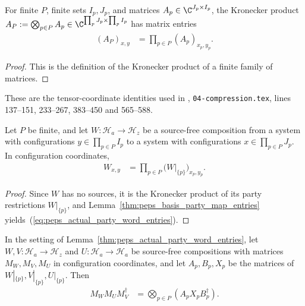 \begin{lemma}
    \label{thm:peps_basis_party_map_entries}
    \leanok
    For finite $P$, finite sets $I_p,J_p$, and matrices $A_p\in\C^{J_p\times I_p}$, the Kronecker product $A_P:=\bigotimes_{p\in P}A_p\in\C^{\prod_pJ_p\times\prod_pI_p}$ has matrix entries
    \begin{align}
        (A_P)_{x,y}
         & =\prod_{p\in P}(A_p)_{x_p,y_p}.
    \end{align}
\end{lemma}

\begin{proof}
    \leanok
    This is the definition of the Kronecker product of a finite family of matrices.
\end{proof}

These are the tensor-coordinate identities used in
\cite[proof of Theorem~5.2]{OpenAI2026PolynomialPEPS},
\texttt{04-compression.tex}, lines 137--151, 233--267, 383--450 and
565--588.


\begin{lemma}
    \label{thm:peps_actual_party_word_entries}
    \leanok
    Let $P$ be finite, and let $W:\mathcal H_a\to\mathcal H_z$ be a source-free composition from a system with configurations $y\in\prod_{p\in P}I_p$ to a system with configurations $x\in\prod_{p\in P}J_p$. In configuration coordinates,
    \begin{align}
        W_{x,y}
         & =\prod_{p\in P}
        \bigl(W|_{\{p\}}\bigr)_{x_p,y_p}.
        \label{eq:peps_actual_party_word_entries}
    \end{align}
\end{lemma}

\begin{proof}\leanok
    Since $W$ has no sources, it is the Kronecker product of its party restrictions $W|_{\{p\}}$, and Lemma~\ref{thm:peps_basis_party_map_entries} yields~(\ref{eq:peps_actual_party_word_entries}).
\end{proof}

\begin{lemma}
    \label{thm:peps_actual_party_mixed_matrix}
    \leanok
    In the setting of Lemma~\ref{thm:peps_actual_party_word_entries}, let $W,V:\mathcal H_a\to\mathcal H_z$ and $U:\mathcal H_a\to\mathcal H_a$ be source-free compositions with matrices $M_W,M_V,M_U$ in configuration coordinates, and let $A_p,B_p,X_p$ be the matrices of $W|_{\{p\}},V|_{\{p\}},U|_{\{p\}}$. Then
    \begin{align}
        M_W M_U M_V^\dagger
         & =\bigotimes_{p\in P}(A_pX_pB_p^\dagger).
        \label{eq:peps_actual_party_mixed_matrix}
    \end{align}
\end{lemma}

